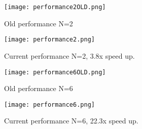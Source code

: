\documentclass[11pt, conference, compsocconf]{IEEEtran}
\begin{document}
\clearpage

\begin{figure}[p]
    \centering
    \texttt{[image: performance2OLD.png]}
    \caption{Old performance N=2}
\end{figure}

\clearpage

\begin{figure}[p]
    \centering
    \texttt{[image: performance2.png]}
    \caption{Current performance N=2, 3.8x speed up.}
\end{figure}

\clearpage


\begin{figure}[p]
    \centering
    \texttt{[image: performance6OLD.png]}
    \caption{Old performance N=6}
\end{figure}

\clearpage

\begin{figure}[p]
    \centering
    \texttt{[image: performance6.png]}
    \caption{Current performance N=6, 22.3x speed up.}
\end{figure}

\clearpage
\end{document}
